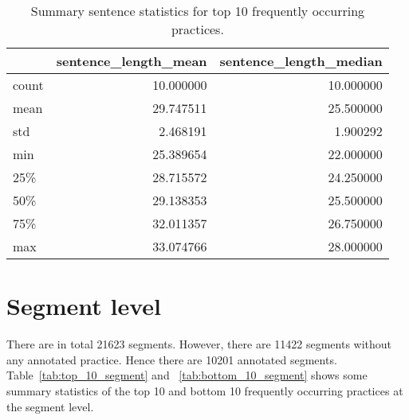 \begin{table}[!ht]
	\centering
	\begin{tabular}{lrr}
		\toprule
		{} &  sentence\_length\_mean &  sentence\_length\_median \\
		\midrule
		count &             10.000000 &               10.000000 \\
		mean  &             29.747511 &               25.500000 \\
		std   &              2.468191 &                1.900292 \\
		min   &             25.389654 &               22.000000 \\
		25\%   &             28.715572 &               24.250000 \\
		50\%   &             29.138353 &               25.500000 \\
		75\%   &             32.011357 &               26.750000 \\
		max   &             33.074766 &               28.000000 \\
		\bottomrule
	\end{tabular}
	\caption{Summary sentence statistics for top 10 frequently occurring practices.}
	\label{tab:summary_top_10_practices}
\end{table}
	

\section{Segment level}

There are in total 21623 segments. However, there are 11422 segments without any annotated practice. Hence there are 10201 annotated segments. Table~\ref{tab:top_10_segment} and ~\ref{tab:bottom_10_segment} shows some summary statistics of the top 10 and bottom 10 frequently occurring practices at the segment level.

